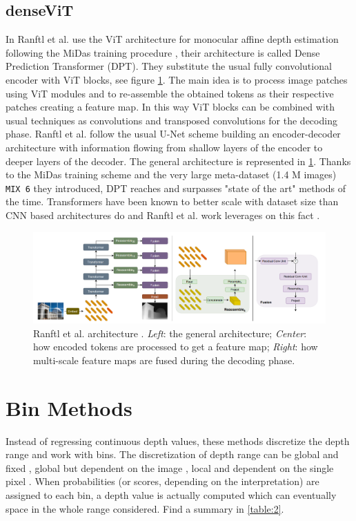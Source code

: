 \subsection{denseViT}
In \cite{denseViT} Ranftl et al. use the ViT \cite{ViT} architecture for monocular affine depth estimation following the MiDas training procedure \cite{MiDas}, their architecture is called Dense Prediction Transformer (DPT).
They substitute the usual fully convolutional encoder with ViT blocks, see figure \ref{fig:denseViT_architecture}.
The main idea is to process image patches using ViT modules and to re-assemble the obtained tokens as their respective patches creating a feature map.
In this way ViT blocks can be combined with usual techniques as convolutions and transposed convolutions for the decoding phase.
Ranftl et al. follow the usual U-Net \cite{UNet} scheme building an encoder-decoder architecture with information flowing from shallow layers of the encoder to deeper layers of the decoder.
The general architecture is represented in \ref{fig:denseViT_architecture}.
Thanks to the MiDas \cite{MiDas} training scheme and the very large meta-dataset (1.4 M images) \texttt{MIX 6} they introduced, DPT reaches and surpasses "state of the art" methods of the time.
Transformers have been known to better scale with dataset size than CNN based architectures do and Ranftl et al. work leverages on this fact \cite{ViT}.

\begin{figure}
\centering
\includegraphics[scale=0.3]{figs/denseViT_architecture}
\caption{Ranftl et al. architecture \cite{denseViT}. \textit{Left}: the general architecture; \textit{Center}: how encoded tokens are processed to get a feature map; \textit{Right}: how multi-scale feature maps are fused during the decoding phase. \label{fig:denseViT_architecture}}
\end{figure}

\section{Bin Methods}
\label{s:bin_methods}
Instead of regressing continuous depth values, these methods discretize the depth range and work with bins.
The discretization of depth range can be global and fixed \cite{depth_as_classification, ordinal_regression}, global but dependent on the image \cite{AdaBins}, local and dependent on the single pixel \cite{ZoeDepth}.
When probabilities (or scores, depending on the interpretation) are assigned to each bin, a depth value is actually computed which can eventually space in the whole range considered.
Find a summary in \ref{table:2}.

